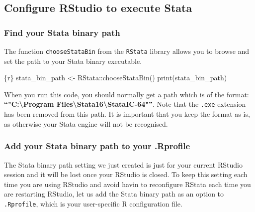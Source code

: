\documentclass[
  letterpaper,
  DIV=11,
  numbers=noendperiod,
  oneside]{scrreprt}
\newenvironment{Shaded}{\begin{snugshade}}{\end{snugshade}}
\newcommand{\FunctionTok}[1]{\textcolor[rgb]{0.28,0.35,0.67}{#1}}
\newcommand{\InformationTok}[1]{\textcolor[rgb]{0.37,0.37,0.37}{#1}}
\newcommand{\NormalTok}[1]{\textcolor[rgb]{0.00,0.23,0.31}{#1}}
\newcommand{\OtherTok}[1]{\textcolor[rgb]{0.00,0.23,0.31}{#1}}
\newcommand{\SpecialCharTok}[1]{\textcolor[rgb]{0.37,0.37,0.37}{#1}}
\begin{document}
\hypertarget{configure-rstudio-to-execute-stata}{%
\subsection{Configure RStudio to execute
Stata}\label{configure-rstudio-to-execute-stata}}

\hypertarget{find-your-stata-binary-path}{%
\subsubsection{Find your Stata binary
path}\label{find-your-stata-binary-path}}

The function \texttt{chooseStataBin} from the \texttt{RStata} library
allows you to browse and set the path to your Stata binary executable.

\begin{Shaded}
\begin{Highlighting}[]
\InformationTok{\textasciigrave{}\textasciigrave{}\textasciigrave{}\{r\}}
\NormalTok{stata\_bin\_path }\OtherTok{\textless{}{-}}\NormalTok{ RStata}\SpecialCharTok{::}\FunctionTok{chooseStataBin}\NormalTok{()}
\FunctionTok{print}\NormalTok{(stata\_bin\_path)}
\InformationTok{\textasciigrave{}\textasciigrave{}\textasciigrave{}}
\end{Highlighting}
\end{Shaded}

When you run this code, you should normally get a path which is of the
format: \textbf{``"C:\textbackslash Program
Files\textbackslash Stata16\textbackslash StataIC-64"''}. Note that the
\texttt{.exe} extension has been removed from this path. It is important
that you keep the format as is, as otherwise your Stata engine will not
be recognised.

\hypertarget{add-your-stata-binary-path-to-your-.rprofile}{%
\subsubsection{Add your Stata binary path to your
.Rprofile}\label{add-your-stata-binary-path-to-your-.rprofile}}

The Stata binary path setting we just created is just for your current
RStudio session and it will be lost once your RStudio is closed. To keep
this setting each time you are using RStudio and avoid havin to
reconfigure RStata each time you are restarting RStudio, let us add the
Stata binary path as an option to \texttt{.Rprofile}, which is your
user-specific R configuration file.
\end{document}
